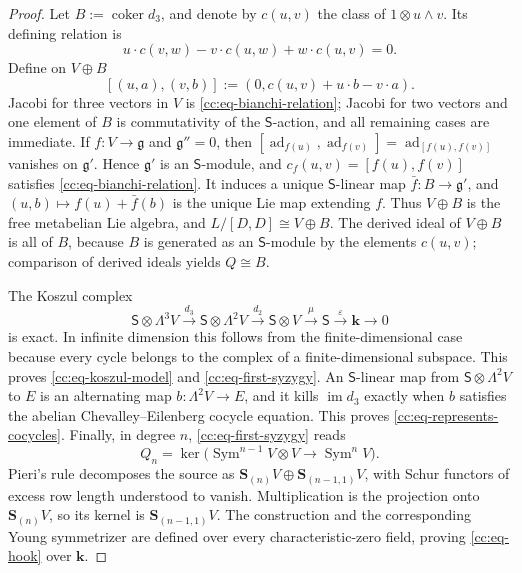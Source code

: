\documentclass[10pt,reqno]{amsart}
\theoremstyle{plain}
\theoremstyle{definition}
\theoremstyle{remark}
\begin{document}
\begin{proof}
Let \(B:=\operatorname{coker}d_3\), and denote by \(c(u,v)\) the class
of \(1\otimes u\wedge v\).  Its defining relation is
\begin{equation}
 u\cdot c(v,w)-v\cdot c(u,w)+w\cdot c(u,v)=0.
 \label{cc:eq-bianchi-relation}
\end{equation}
Define on \(V\oplus B\)
\[
 [(u,a),(v,b)]:=(0,c(u,v)+u\cdot b-v\cdot a).
\]
Jacobi for three vectors in \(V\) is
\eqref{cc:eq-bianchi-relation}; Jacobi for two vectors and one element
of \(B\) is commutativity of the \(\mathsf S\)-action, and all remaining
cases are immediate.  If \(f:V\to\mathfrak g\) and
\(\mathfrak g''=0\), then
\([{\operatorname{ad}}_{f(u)},{\operatorname{ad}}_{f(v)}]={\operatorname{ad}}_{[f(u),f(v)]}\) vanishes on
\(\mathfrak g'\).  Hence \(\mathfrak g'\) is an \(\mathsf S\)-module,
and \(c_f(u,v)=[f(u),f(v)]\) satisfies
\eqref{cc:eq-bianchi-relation}.  It induces a unique
\(\mathsf S\)-linear map \(\bar f:B\to\mathfrak g'\), and
\((u,b)\mapsto f(u)+\bar f(b)\) is the unique Lie map extending \(f\).
Thus \(V\oplus B\) is the free metabelian Lie algebra, and
\(L/[D,D]\cong V\oplus B\).  The derived ideal of \(V\oplus B\) is all
of \(B\), because \(B\) is generated as an \(\mathsf S\)-module by the
elements \(c(u,v)\); comparison of derived ideals yields \(Q\cong B\).

The Koszul complex
\[
 \mathsf S\otimes\Lambda^3V\xrightarrow{d_3}
 \mathsf S\otimes\Lambda^2V\xrightarrow{d_2}
 \mathsf S\otimes V\xrightarrow{\mu}\mathsf S
 \xrightarrow{\varepsilon}\mathbf k\longrightarrow0
\]
is exact.  In infinite dimension this follows from the finite-dimensional
case because every cycle belongs to the complex of a finite-dimensional
subspace.  This proves \eqref{cc:eq-koszul-model} and
\eqref{cc:eq-first-syzygy}.
An \(\mathsf S\)-linear
map from \(\mathsf S\otimes\Lambda^2V\) to \(E\) is an alternating map
\(b:\Lambda^2V\to E\), and it kills \(\operatorname{im}d_3\) exactly
when \(b\) satisfies the abelian Chevalley--Eilenberg cocycle equation.
This proves \eqref{cc:eq-represents-cocycles}.  Finally, in degree
\(n\), \eqref{cc:eq-first-syzygy} reads
\[
 Q_n=\ker\bigl({\operatorname{Sym}}^{n-1}V\otimes V\to{\operatorname{Sym}}^nV\bigr).
\]
Pieri's rule \cite[\S6.1 and Ch.~8]{Fulton97} decomposes the source as
\(\mathbf S_{(n)}V\oplus\mathbf S_{(n-1,1)}V\), with Schur functors of
excess row length understood to vanish.  Multiplication is the projection
onto \(\mathbf S_{(n)}V\), so its kernel is
\(\mathbf S_{(n-1,1)}V\).  The construction and the corresponding Young
symmetrizer are defined over every characteristic-zero field, proving
\eqref{cc:eq-hook} over \(\mathbf k\).
\end{proof}
\end{document}
